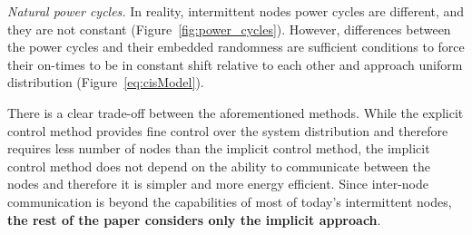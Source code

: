 \noindent\textit{Natural power cycles.}
In reality, intermittent nodes power cycles are different, and they are not constant (Figure~\ref{fig:power_cycles}). However, differences between the power cycles and their embedded randomness are sufficient conditions to force their on-times to be in constant shift relative to each other and approach uniform distribution (Figure~\ref{eq:cisModel}). 

There is a clear trade-off between the aforementioned methods. While the explicit control method provides fine control over the system 
distribution and therefore requires less number of nodes than the implicit control method, the implicit control method does not depend on the ability to communicate between the nodes and therefore it is simpler and more energy efficient. Since inter-node communication is beyond the capabilities of most of today's intermittent nodes, \textbf{the rest of the paper considers only the implicit approach}.
 

